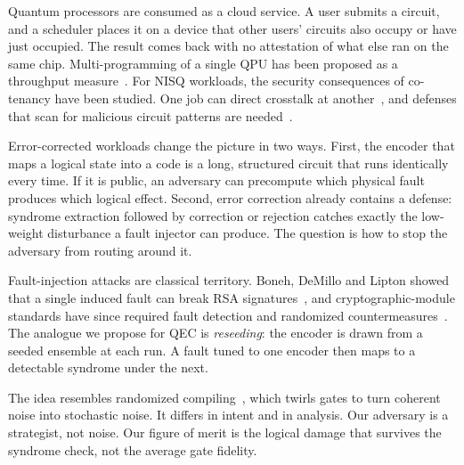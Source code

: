 Quantum processors are consumed as a cloud service. A user submits a circuit, and a scheduler places it on a device that other users' circuits also occupy or have just occupied. The result comes back with no attestation of what else ran on the same chip. Multi-programming of a single QPU has been proposed as a throughput measure~\cite{das2019multiprogramming}. For NISQ workloads, the security consequences of co-tenancy have been studied. One job can direct crosstalk at another~\cite{ashsaki2020crosstalk}, and defenses that scan for malicious circuit patterns are needed~\cite{deshpande2022antivirus}.

Error-corrected workloads change the picture in two ways. First, the encoder that maps a logical state into a code is a long, structured circuit that runs identically every time. If it is public, an adversary can precompute which physical fault produces which logical effect. Second, error correction already contains a defense: syndrome extraction followed by correction or rejection catches exactly the low-weight disturbance a fault injector can produce. The question is how to stop the adversary from routing around it.

Fault-injection attacks are classical territory. Boneh, DeMillo and Lipton showed that a single induced fault can break RSA signatures~\cite{boneh1997faults}, and cryptographic-module standards have since required fault detection and randomized countermeasures~\cite{nist2019fips1403}. The analogue we propose for QEC is \emph{reseeding}: the encoder is drawn from a seeded ensemble at each run. A fault tuned to one encoder then maps to a detectable syndrome under the next.

The idea resembles randomized compiling~\cite{wallman2016randomizedcompiling}, which twirls gates to turn coherent noise into stochastic noise. It differs in intent and in analysis. Our adversary is a strategist, not noise. Our figure of merit is the logical damage that survives the syndrome check, not the average gate fidelity.

